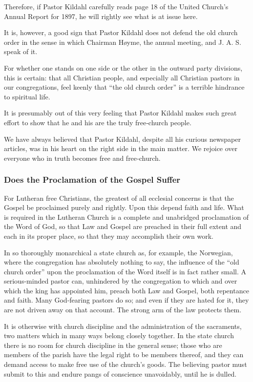 Therefore, if Pastor Kildahl carefully reads page 18 of the United Church’s Annual Report for 1897, he will rightly see what is at issue here.

It is, however, a good sign that Pastor Kildahl does not defend the old church order in the sense in which Chairman Høyme, the annual meeting, and J. A. S. speak of it.

For whether one stands on one side or the other in the outward party divisions, this is certain: that all Christian people, and especially all Christian pastors in our congregations, feel keenly that “the old church order” is a terrible hindrance to spiritual life.

It is presumably out of this very feeling that Pastor Kildahl makes such great effort to show that he and his are the truly free‑church people.

We have always believed that Pastor Kildahl, despite all his curious newspaper articles, was in his heart on the right side in the main matter. We rejoice over everyone who in truth becomes free and free‑church.

\subsubsection{Does the Proclamation of the Gospel Suffer}

For Lutheran free Christians, the greatest of all ecclesial concerns is that the Gospel be proclaimed purely and rightly. Upon this depend faith and life. What is required in the Lutheran Church is a complete and unabridged proclamation of the Word of God, so that Law and Gospel are preached in their full extent and each in its proper place, so that they may accomplish their own work.

In so thoroughly monarchical a state church as, for example, the Norwegian, where the congregation has absolutely nothing to say, the influence of the “old church order” upon the proclamation of the Word itself is in fact rather small. A serious-minded pastor can, unhindered by the congregation to which and over which the king has appointed him, preach both Law and Gospel, both repentance and faith. Many God-fearing pastors do so; and even if they are hated for it, they are not driven away on that account. The strong arm of the law protects them.

It is otherwise with church discipline and the administration of the sacraments, two matters which in many ways belong closely together. In the state church there is no room for church discipline in the general sense; those who are members of the parish have the legal right to be members thereof, and they can demand access to make free use of the church’s goods. The believing pastor must submit to this and endure pangs of conscience unavoidably, until he is dulled.

